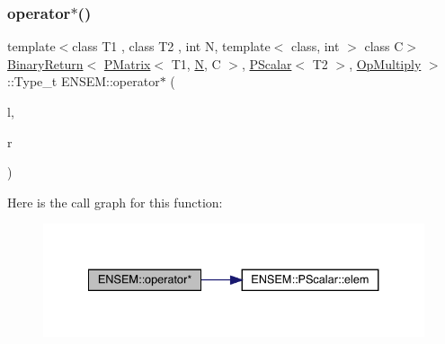 \subsubsection{\texorpdfstring{operator$\ast$()}{operator*()}\hspace{0.1cm}{\footnotesize\ttfamily [1/3]}}
{\footnotesize\ttfamily template$<$class T1 , class T2 , int N, template$<$ class, int $>$ class C$>$ \\
\mbox{\hyperlink{structENSEM_1_1BinaryReturn}{Binary\+Return}}$<$ \mbox{\hyperlink{classENSEM_1_1PMatrix}{P\+Matrix}}$<$ T1, \mbox{\hyperlink{operator__name__util_8cc_a7722c8ecbb62d99aee7ce68b1752f337}{N}}, C $>$, \mbox{\hyperlink{classENSEM_1_1PScalar}{P\+Scalar}}$<$ T2 $>$, \mbox{\hyperlink{structENSEM_1_1OpMultiply}{Op\+Multiply}} $>$\+::Type\+\_\+t E\+N\+S\+E\+M\+::operator$\ast$ (\begin{DoxyParamCaption}\item[{const \mbox{\hyperlink{classENSEM_1_1PMatrix}{P\+Matrix}}$<$ T1, \mbox{\hyperlink{operator__name__util_8cc_a7722c8ecbb62d99aee7ce68b1752f337}{N}}, C $>$ \&}]{l,  }\item[{const \mbox{\hyperlink{classENSEM_1_1PScalar}{P\+Scalar}}$<$ T2 $>$ \&}]{r }\end{DoxyParamCaption})\hspace{0.3cm}{\ttfamily [inline]}}

Here is the call graph for this function\+:\nopagebreak
\begin{figure}[H]
\begin{center}
\leavevmode
\includegraphics[width=334pt]{df/d0a/group__primmatrix_ga9edd8305793268c1fbc1b874baa000d3_cgraph}
\end{center}
\end{figure}
\mbox{\label{group__primmatrix_ga2f9521924540b40d00ad4aa1606bfb22}} 
